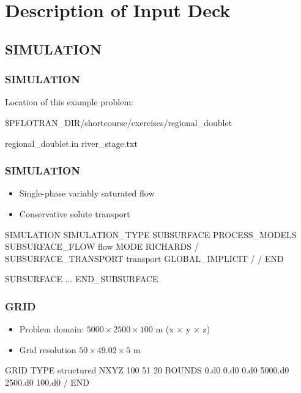 \documentclass{beamer}
\begin{document}
\section{Description of Input Deck}

\subsection{SIMULATION}

\begin{frame}\frametitle{SIMULATION}

Location of this example problem:

\begin{semiverbatim}
\$PFLOTRAN_DIR/shortcourse/exercises/regional_doublet

regional_doublet.in
river_stage.txt
\end{semiverbatim}

\end{frame}

\begin{frame}\frametitle{SIMULATION}

\begin{itemize}
  \item Single-phase variably saturated flow
  \item Conservative solute transport
\end{itemize}

\begin{semiverbatim}
SIMULATION
  SIMULATION_TYPE SUBSURFACE
  PROCESS_MODELS
    SUBSURFACE_FLOW flow
      MODE RICHARDS
    /
    SUBSURFACE_TRANSPORT transport
      GLOBAL_IMPLICIT
    /
  /
END

SUBSURFACE
  ...
END_SUBSURFACE
\end{semiverbatim}

\end{frame}

\begin{frame}\frametitle{GRID}

\begin{itemize}
  \item Problem domain: $5000 \times 2500 \times 100$ m (x $\times$ y $\times$ z)
  \item Grid resolution $50 \times 49.02 \times 5$ m
\end{itemize}

\begin{semiverbatim}
GRID
  TYPE structured
  NXYZ 100 51 20
  BOUNDS
    0.d0 0.d0 0.d0
    5000.d0 2500.d0 100.d0
  /
END
\end{semiverbatim}

\end{frame}
\end{document}
